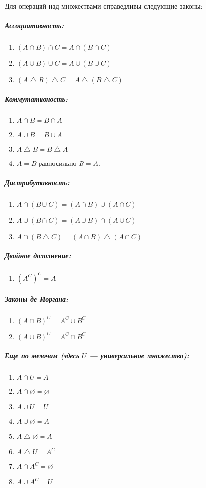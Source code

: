 \begin{thm}Для операций над множествами справедливы следующие законы:
\subparagraph{Ассоциативность:}
\begin{enumerate}
\item $(A \cap B) \cap C = A \cap (B \cap C)$
\item $(A \cup B) \cup C = A \cup (B \cup C)$
\item $(A \bigtriangleup B) \bigtriangleup C = A \bigtriangleup (B \bigtriangleup C)$
\end{enumerate}
\subparagraph{Коммутативность:}
\begin{enumerate}
\item $A \cap B = B \cap A$
\item $A \cup B = B \cup A$
\item $A \bigtriangleup B = B \bigtriangleup A$
\item $A = B$ равносильно $B = A$.
\end{enumerate}
\subparagraph{Дистрибутивность:}
\begin{enumerate}
\item $A \cap (B \cup C) = (A \cap B) \cup (A \cap C)$
\item $A \cup (B \cap C) = (A \cup B) \cap (A \cup C)$
\item $A \cap (B \bigtriangleup C) = (A \cap B) \bigtriangleup (A \cap C)$
\end{enumerate}
\subparagraph{Двойное дополнение:}
\begin{enumerate}
\item $(A^C)^C = A$
\end{enumerate}
\subparagraph{Законы де Моргана:}
\begin{enumerate}
\item $(A \cap B)^C = A^C \cup B^C$
\item $(A \cup B)^C =A^C \cap B^C$
\end{enumerate}
\subparagraph{Еще по мелочам (здесь $U$ — универсальное множество):}
\begin{enumerate}
\item $A \cap U = A$
\item $A \cap \varnothing = \varnothing$
\item $A \cup U = U$
\item $A \cup \varnothing = A$
\item $A \bigtriangleup \varnothing = A$
\item $A \bigtriangleup U = A^C$
\item $A \cap A^C = \varnothing$
\item $A \cup A^C = U$

\end{enumerate}
\end{thm}
